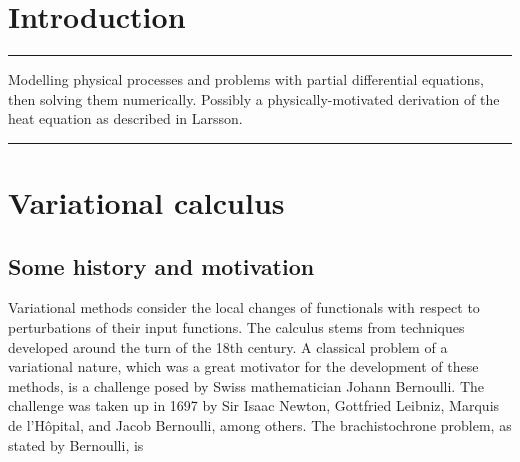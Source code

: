 \documentclass[11pt,a4paper]{memoir}
\newcommand{\todo}[1]{\vskip 0.1in \hrule \vskip 0.03in {#1} \vskip 0.03in \hrule \vskip 0.1in}
\begin{document}
\begin{itemize}
% 
% 
\end{itemize}
\newpage


\tableofcontents
\newpage

\section{Introduction}
\todo{
Modelling physical processes and problems with partial differential equations, then solving them numerically.
Possibly a physically-motivated derivation of the heat equation as described in Larsson.

}

\section{Variational calculus}
\subsection{Some history and motivation}

Variational methods consider the local changes of functionals with respect to perturbations
of their input functions. The calculus stems from techniques developed around the turn of the 18th century. A classical problem of a variational nature,
which was a great motivator for the development of these methods, is a challenge posed by Swiss mathematician Johann Bernoulli.
The challenge was taken up in 1697 by Sir Isaac Newton, Gottfried Leibniz, Marquis de l'H\^opital, and Jacob Bernoulli, among others. The
brachistochrone problem, as stated by Bernoulli, is \cite{johann_bernoulli}
\end{document}
